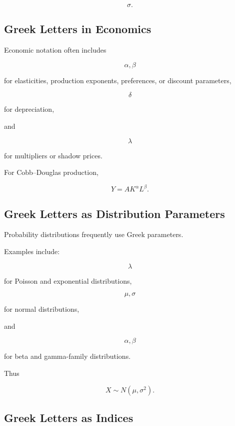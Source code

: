 \[
\boxed{
\sigma.
}
\]

\subsection{Greek Letters in Economics}
\label{subsec:greek-economics-uses}

Economic notation often includes

\[
\boxed{
\alpha,\beta
}
\]

for elasticities, production exponents, preferences, or discount parameters,

\[
\boxed{
\delta
}
\]

for depreciation,

and

\[
\boxed{
\lambda
}
\]

for multipliers or shadow prices.

For Cobb--Douglas production,

\[
\boxed{
Y
=
AK^\alpha L^\beta.
}
\]

\subsection{Greek Letters as Distribution Parameters}
\label{subsec:greek-distribution-parameters}

Probability distributions frequently use Greek parameters.

Examples include:

\[
\boxed{
\lambda
}
\]

for Poisson and exponential distributions,

\[
\boxed{
\mu,\sigma
}
\]

for normal distributions,

and

\[
\boxed{
\alpha,\beta
}
\]

for beta and gamma-family distributions.

Thus

\[
\boxed{
X
\sim
N(\mu,\sigma^2).
}
\]

\subsection{Greek Letters as Indices}
\label{subsec:greek-indices}

